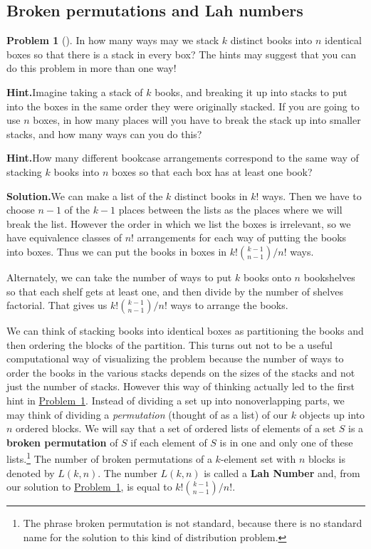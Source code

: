 \documentclass[10pt,]{book}
\newcommand{\terminology}[1]{\textbf{#1}}
\theoremstyle{plain}
\theoremstyle{definition}
\newtheorem{activity}[project]{Problem}
\theoremstyle{definition}
\numberwithin{equation}{chapter}
\begin{document}
\subsection[{Broken permutations and Lah numbers}]{Broken permutations and Lah numbers}\label{subsection-26}
\begin{activity}[]\label{brokenpermutation}
In how many ways may we stack \(k\) distinct books into \(n\) identical boxes so that there is a stack in every box? The hints may suggest that you can do this problem in more than one way!%
\par\medskip\noindent%
\textbf{Hint.}\quad Imagine taking a stack of \(k\) books, and breaking it up into stacks to put into the boxes in the same order they were originally stacked. If you are going to use \(n\) boxes, in how many places will you have to break the stack up into smaller stacks, and how many ways can you do this?%
\par\medskip\noindent%
\textbf{Hint.}\quad How many different bookcase arrangements correspond to the same way of stacking \(k\) books into \(n\) boxes so that each box has at least one book?%
\par\medskip\noindent%
\textbf{Solution.}\quad We can make a list of the \(k\) distinct books in \(k!\) ways. Then we have to choose \(n-1\) of the \(k-1\) places between the lists as the places where we will break the list. However the order in which we list the boxes is irrelevant, so we have equivalence classes of \(n!\) arrangements for each way of putting the books into boxes. Thus we can put the books in boxes in \(k!\binom{k-1}{n-1}/n!\) ways.%
\par
Alternately, we can take the number of ways to put \(k\) books onto \(n\) bookshelves so that each shelf gets at least one, and then divide by the number of shelves factorial. That gives us \(k!\binom{k-1}{n-1}/n!\) ways to arrange the books.%
\end{activity}
We can think of stacking books into identical boxes as partitioning the books and then ordering the blocks of the partition. This turns out not to be a useful computational way of visualizing the problem because the number of ways to order the books in the various stacks depends on the sizes of the stacks and not just the number of stacks. However this way of thinking actually led to the first hint in \hyperref[brokenpermutation]{Problem~\ref{brokenpermutation}}. Instead of dividing a set up into nonoverlapping parts, we may think of dividing a \emph{permutation} (thought of as a list) of our \(k\) objects up into \(n\) ordered blocks. We will say that a set of ordered lists of elements of a set \(S\) is a \terminology{broken permutation} of \(S\) if each element of \(S\) is in one and only one of these lists.\footnote{The phrase broken permutation is not standard, because there is no standard name for the solution to this kind  of distribution problem.\label{fn-7}} The number of broken permutations of a \(k\)-element set with \(n\) blocks is denoted by \(L(k,n)\). The number \(L(k,n)\) is called a \terminology{Lah Number} and, from our solution to \hyperref[brokenpermutation]{Problem~\ref{brokenpermutation}}, is equal to \(k!\binom{k-1}{n-1}/n!\).%
\end{document}
